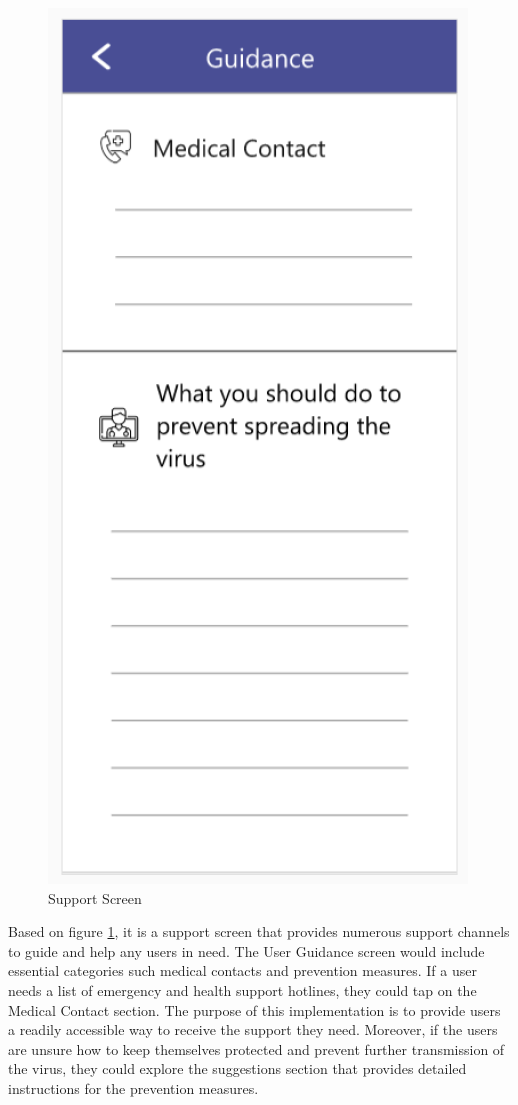 \begin{enumerate}[a)]
          \begin{figure}[H]
            \centering
            \includegraphics[scale=1]{img/prototype/iter3-proto-4.png}
            \caption{Support Screen}
            \label{fig:iter3-proto-4}
          \end{figure}
          Based on figure \ref{fig:iter3-proto-4}, it is a support screen that provides numerous support channels to guide and help any users in need. The User Guidance screen would include essential categories such medical contacts and prevention measures. If a user needs a list of emergency and health support hotlines, they could tap on the Medical Contact section. The purpose of this implementation is to provide users a readily accessible way to receive the support they need. Moreover, if the users are unsure how to keep themselves protected and prevent further transmission of the virus, they could explore the suggestions section that provides detailed instructions for the prevention measures.

\end{enumerate}
